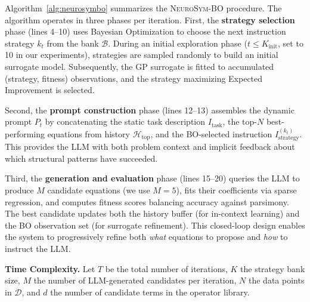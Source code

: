 \documentclass[twoside,11pt]{article}
\newcommand{\1}{{\bf 1}}
\newcommand{\0}{{\bf 0}}
\begin{document}
Algorithm~\ref{alg:neurosymbo} summarizes the \textsc{NeuroSym-BO} procedure. 
The algorithm operates in three phases per iteration. First, the \textbf{strategy selection} phase (lines 4--10) uses Bayesian Optimization to choose the next instruction strategy $k_t$ from the bank $\mathcal{B}$. During an initial exploration phase ($t \leq K_{\text{init}}$, set to 10 in our experiments), strategies are sampled randomly to build an initial surrogate model. Subsequently, the GP surrogate is fitted to accumulated (strategy, fitness) observations, and the strategy maximizing Expected Improvement is selected.

Second, the \textbf{prompt construction} phase (lines 12--13) assembles the dynamic prompt $P_t$ by concatenating the static task description $I_{\text{task}}$, the top-$N$ best-performing equations from history $\mathcal{H}_{\text{top}}$, and the BO-selected instruction $I_{\text{strategy}}^{(k_t)}$. This provides the LLM with both problem context and implicit feedback about which structural patterns have succeeded.

Third, the \textbf{generation and evaluation} phase (lines 15--20) queries the LLM to produce $M$ candidate equations (we use $M=5$), fits their coefficients via sparse regression, and computes fitness scores balancing accuracy against parsimony. The best candidate updates both the history buffer (for in-context learning) and the BO observation set (for surrogate refinement). This closed-loop design enables the system to progressively refine both \textit{what} equations to propose and \textit{how} to instruct the LLM.

\textbf{Time Complexity.} Let $T$ be the total number of iterations, $K$ the strategy bank size, $M$ the number of LLM-generated candidates per iteration, $N$ the data points in $\mathcal{D}$, and $d$ the number of candidate terms in the operator library.
\end{document}
